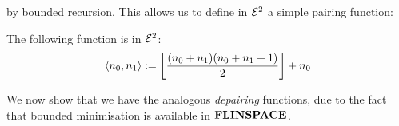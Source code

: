 \documentclass{lmcs}
\begin{document}
%	
%	
%
by bounded recursion.
This allows us to define in $\mathcal{E}^2$ a simple pairing function:
\begin{proposition}
	\label{prop:pairing}
	The following function is in $\mathcal{E}^2$:
	$$\langle  n_0 ,  n_1 \rangle
	:=
	{\left\lfloor\frac{( {n_0+n_1} )({n_0+n_1+1})}{2}\right\rfloor + n_0}$$
\end{proposition}
%
%

We now show that we have the analogous \emph{depairing} functions, due to the fact that bounded minimisation is available in $\mathbf{FLINSPACE}$.
\end{document}

